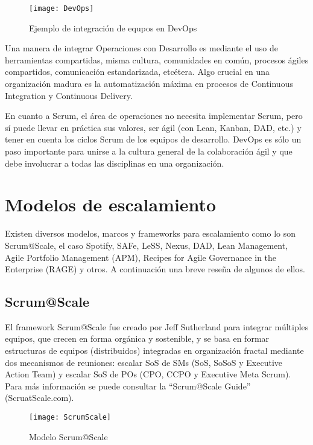 \begin{figure}[h]
  \centering
  \texttt{[image: DevOps]}
  \caption{Ejemplo de integración de equpos en DevOps}
  \centering
  \label{fig:DevOps} %
\end{figure}

Una manera de integrar Operaciones con Desarrollo es mediante el uso de herramientas compartidas, misma cultura, comunidades en común, procesos ágiles compartidos, comunicación estandarizada, etcétera. Algo crucial en una organización madura es la automatización máxima en procesos de Continuous Integration y Continuous Delivery.

En cuanto a Scrum, el área de operaciones no necesita implementar Scrum, pero sí puede llevar en práctica sus valores, ser ágil (con Lean, Kanban, DAD, etc.) y tener en cuenta los ciclos Scrum de los equipos de desarrollo. DevOps es sólo un paso importante para unirse a la cultura general de la colaboración ágil y que debe involucrar a todas las disciplinas en una organización. 


\section{Modelos de escalamiento}

Existen diversos modelos, marcos y frameworks para escalamiento como lo son Scrum@Scale, el caso Spotify, SAFe, LeSS, Nexus, DAD, Lean Management, Agile Portfolio Management (APM), Recipes for Agile Governance in the Enterprise (RAGE) y otros. A continuación una breve reseña de algunos de ellos.

\subsection{Scrum@Scale}
El framework Scrum@Scale fue creado por Jeff Sutherland para integrar múltiples equipos, que crecen en forma orgánica y sostenible, y se basa en formar estructuras de equipos (distribuidos) integradas en organización fractal mediante dos mecanismos de reuniones: escalar SoS de SMs (SoS, SoSoS y Executive Action Team) y escalar SoS de POs (CPO, CCPO y Executive Meta Scrum). Para más información se puede consultar la “Scrum@Scale Guide” (ScruatScale.com).

\begin{figure}[h]
  \centering
  \texttt{[image: ScrumScale]}
  \caption{Modelo Scrum@Scale}
  \centering
  \label{fig:ScrumScale} %
\end{figure}

